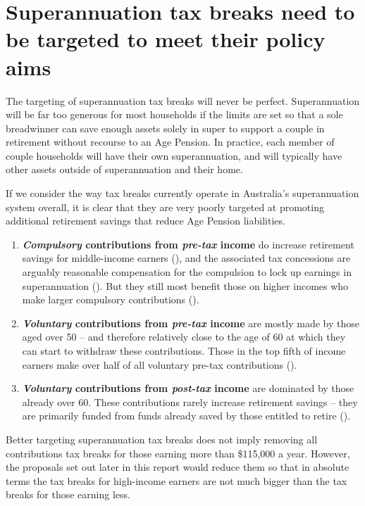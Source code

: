 \section{Superannuation tax breaks need to be targeted to meet their policy aims}\label{sec:SUPER-3-7}
The targeting of superannuation tax breaks will never be perfect. Superannuation will be far too generous for most households if the limits are set so that a sole breadwinner can save enough assets solely in super to support a couple in retirement without recourse to an Age Pension. In practice, each member of couple households will have their own superannuation, and will typically have other assets outside of superannuation and their home.

If we consider the way tax breaks currently operate in Australia’s superannuation system overall, it is clear that they are very poorly targeted at promoting additional retirement savings that reduce Age Pension liabilities.

\begin{enumerate}
\renewcommand{\ULthickness}{0.66pt}
\renewcommand{\ULdepth}{0.7ex}
\newcommand{\outerbf}[1]{\textbf{#1}}
\newcommand{\emphbf}[1]{\textit{#1}}
\renewcommand{\labelenumi}{\textbf{\textcolor{Orange}{\arabic{enumi}.~}}}
\item \outerbf{\emphbf{Compulsory} contributions from \emphbf{pre-tax} income} do increase retirement savings for middle-income earners (), and the associated tax concessions are arguably reasonable compensation for the compulsion to lock up earnings in superannuation (). But they still most benefit those on higher incomes who make larger compulsory contributions ().
\item \outerbf{\emphbf{Voluntary} contributions from \emphbf{pre-tax} income} are mostly made by those aged over 50 – and therefore relatively close to the age of 60 at which they can start to withdraw these contributions. Those in the top fifth of income earners make over half of all voluntary pre-tax contributions (). 
\item \outerbf{\emphbf{Voluntary} contributions from \emphbf{post-tax} income} are dominated by those already over 60. These contributions rarely increase retirement savings – they are primarily funded from funds already saved by those entitled to retire (). 
\end{enumerate}


Better targeting superannuation tax breaks does not imply removing all contributions tax breaks for those earning more than \$115,000 a year. However, the proposals set out later in this report would reduce them so that in absolute terms the tax breaks for high-income earners are not much bigger than the tax breaks for those earning less. 

